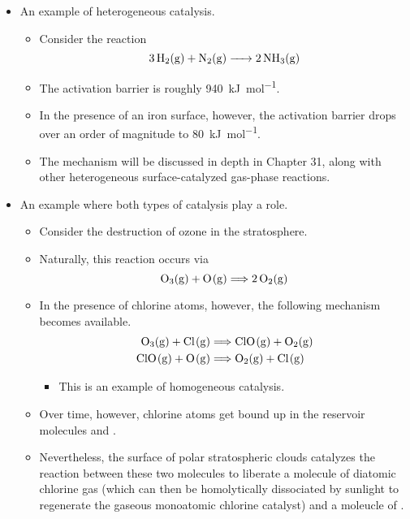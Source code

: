 \documentclass[../notes.tex]{subfiles}
\begin{document}
\begin{itemize}
    \item An example of heterogeneous catalysis.
    \begin{itemize}
        \item Consider the reaction
        \begin{equation*}
            \ce{3H2(g) + N2(g) -> 2NH3(g)}
        \end{equation*}
        \item The activation barrier is roughly \SI[per-mode=symbol]{940}{\kilo\joule\per\mole}.
        \item In the presence of an iron surface, however, the activation barrier drops over an order of magnitude to \SI[per-mode=symbol]{80}{\kilo\joule\per\mole}.
        \item The mechanism will be discussed in depth in Chapter 31, along with other heterogeneous surface-catalyzed gas-phase reactions.
    \end{itemize}
    \item An example where both types of catalysis play a role.
    \begin{itemize}
        \item Consider the destruction of ozone in the stratosphere.
        \item Naturally, this reaction occurs via
        \begin{equation*}
            \ce{O3(g) + O(g)} \Longrightarrow \ce{2O2(g)}
        \end{equation*}
        \item In the presence of chlorine atoms, however, the following mechanism becomes available.
        \begin{align*}
            \ce{O3(g) + Cl(g)} &\Longrightarrow \ce{ClO(g) + O2(g)}\\
            \ce{ClO(g) + O(g)} &\Longrightarrow \ce{O2(g) + Cl(g)}
        \end{align*}
        \begin{itemize}
            \item This is an example of homogeneous catalysis.
        \end{itemize}
        \item Over time, however, chlorine atoms get bound up in the reservoir molecules  and .
        \item Nevertheless, the surface of polar stratospheric clouds catalyzes the reaction between these two molecules to liberate a molecule of diatomic chlorine gas (which can then be homolytically dissociated by sunlight to regenerate the gaseous monoatomic chlorine catalyst) and a moleucle of .

\end{itemize}
\end{itemize}
\end{document}
